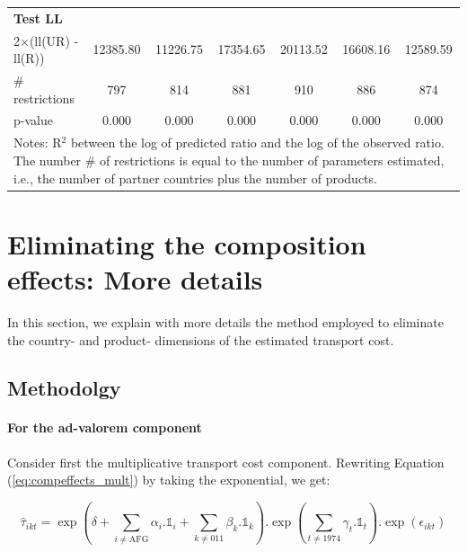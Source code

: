 \documentclass[a4paper,11pt]{article}
\begin{document}
\begin{table}[htbp]
\begin{center}
\begin{tabular}{l|cccccc}
\textbf{Test LL} &       &       & & &  & \\
2$\times$(ll(UR) -ll(R)) & 12385.80 & 11226.75 & \multicolumn{1}{c}{17354.65} & \multicolumn{1}{c}{20113.52} & \multicolumn{1}{c}{16608.16} & \multicolumn{1}{c}{12589.59} \\
\# restrictions  & 797   & 814   & \multicolumn{1}{c}{881} & \multicolumn{1}{c}{910} & \multicolumn{1}{c}{886} & \multicolumn{1}{c}{874} \\
p-value & 0.000 & 0.000 & \multicolumn{1}{c}{0.000} & \multicolumn{1}{c}{0.000} & \multicolumn{1}{c}{0.000} & \multicolumn{1}{c}{0.000} \\
\hline\hline
\multicolumn{7}{l}{\parbox[l]{15cm}{ \vspace{7pt}\scriptsize{Notes: R$^{2}$ between the log of predicted ratio and the log of the observed ratio. The number \# of restrictions is equal to the number of parameters estimated, i.e., the number of partner countries plus the number of products.}}}
\end{tabular}%
\end{center}
\end{table}%


\section{Eliminating the composition effects: More details \label{app:comp-effects}}

In this section, we explain with more details the method employed to eliminate the country- and product- dimensions of the estimated transport cost.

\subsection{Methodolgy}
\paragraph{For the ad-valorem component} Consider first the multiplicative transport cost component. Rewriting Equation (\ref{eq:compeffects_mult}) by taking the exponential, we get:

\begin{equation*}
\widehat{\tau}_{ikt}=\exp\left(\delta + \sum_{i \neq \text{AFG}}\alpha_i.\mathbb{1}_i+\sum_{k\neq \text{011}}\beta_k.\mathbb{1}_k\right).\exp\left(\sum_{t \neq 1974}\gamma_t.\mathbb{1}_t\right) .\exp\left(\epsilon_{ikt}\right)
\end{equation*}
\end{document}
